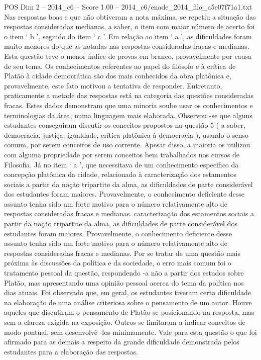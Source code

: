 \begin{textsample}{POS Dim 2 – 2014\_c6 – Score 1.00 – 2014\_c6/enade\_2014\_filo\_a5e07f71a1.txt}
Nas respostas boas e que não obtiveram a nota máxima, se repetiu a situação das respostas consideradas medianas, a saber, o item com maior número de acerto foi o item ‘ b ’, seguido do item ‘ c ’.
Em relação ao item ‘ a ’, as dificuldades foram muito menores do que as notadas nas respostas consideradas fracas e medianas.
Esta questão teve o menor índice de provas em branco, provavelmente por causa de seu tema.
Os conhecimentos referentes ao papel do filósofo e à crítica de Platão à cidade democrática são dos mais conhecidos da obra platônica e, provavelmente, este fato motivou a tentativa de responder.
Entretanto, praticamente a metade das respostas está na categoria das questões consideradas fracas.
Estes dados demonstram que uma minoria soube usar os conhecimentos e terminologias da área, numa linguagem mais elaborada.
Observou -se que alguns estudantes conseguiram discutir os conceitos propostos na questão 5 ( a saber, democracia, justiça, igualdade, crítica platônica à democracia ), usando o senso comum, por serem conceitos de uso corrente.
Apesar disso, a maioria os utilizou com alguma propriedade por serem conceitos bem trabalhados nos cursos de Filosofia.
Já no item ‘ a ’, que necessitava de um conhecimento específico da concepção platônica da cidade, relacionado à caracterização dos estamentos sociais a partir da noção tripartite da alma, as dificuldades de parte considerável dos estudantes foram maiores.
Provavelmente, o conhecimento deficiente desse assunto tenha sido um forte motivo para o número relativamente alto de respostas consideradas fracas e medianas. caracterização dos estamentos sociais a partir da noção tripartite da alma, as dificuldades de parte considerável dos estudantes foram maiores.
Provavelmente, o conhecimento deficiente desse assunto tenha sido um forte motivo para o número relativamente alto de respostas consideradas fracas e medianas.
Por se tratar de uma questão mais próxima às discussões da política e da sociedade, o erro mais comum foi o tratamento pessoal da questão, respondendo -a não a partir dos estudos sobre Platão, mas apresentando uma opinião pessoal acerca do tema da política nos dias atuais.
Foi observado que, em geral, os estudantes tiveram certa dificuldade na elaboração de uma análise criteriosa sobre o pensamento de um autor.
Houve aqueles que discutiram o pensamento de Platão se posicionando na resposta, mas sem a clareza exigida na exposição.
Outros se limitaram a indicar conceitos de modo pontual, sem desenvolvê -los minimamente.
Vale para esta questão o que foi afirmado para as demais a respeito da grande dificuldade demonstrada pelos estudantes para a elaboração das respostas.

\end{textsample}
